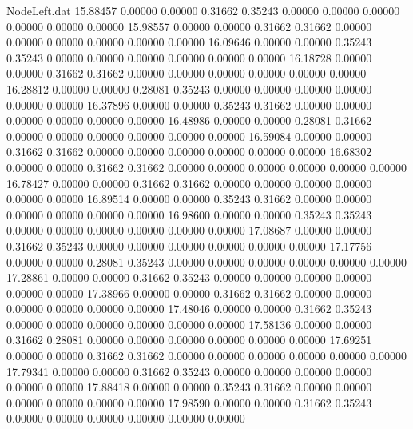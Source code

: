 \begin{filecontents}{NodeLeft.dat}
  15.88457    0.00000    0.00000     0.31662    0.35243    0.00000    0.00000    0.00000    0.00000    0.00000    0.00000
  15.98557    0.00000    0.00000     0.31662    0.31662    0.00000    0.00000    0.00000    0.00000    0.00000    0.00000
  16.09646    0.00000    0.00000     0.35243    0.35243    0.00000    0.00000    0.00000    0.00000    0.00000    0.00000
  16.18728    0.00000    0.00000     0.31662    0.31662    0.00000    0.00000    0.00000    0.00000    0.00000    0.00000
  16.28812    0.00000    0.00000     0.28081    0.35243    0.00000    0.00000    0.00000    0.00000    0.00000    0.00000
  16.37896    0.00000    0.00000     0.35243    0.31662    0.00000    0.00000    0.00000    0.00000    0.00000    0.00000
  16.48986    0.00000    0.00000     0.28081    0.31662    0.00000    0.00000    0.00000    0.00000    0.00000    0.00000
  16.59084    0.00000    0.00000     0.31662    0.31662    0.00000    0.00000    0.00000    0.00000    0.00000    0.00000
  16.68302    0.00000    0.00000     0.31662    0.31662    0.00000    0.00000    0.00000    0.00000    0.00000    0.00000
  16.78427    0.00000    0.00000     0.31662    0.31662    0.00000    0.00000    0.00000    0.00000    0.00000    0.00000
  16.89514    0.00000    0.00000     0.35243    0.31662    0.00000    0.00000    0.00000    0.00000    0.00000    0.00000
  16.98600    0.00000    0.00000     0.35243    0.35243    0.00000    0.00000    0.00000    0.00000    0.00000    0.00000
  17.08687    0.00000    0.00000     0.31662    0.35243    0.00000    0.00000    0.00000    0.00000    0.00000    0.00000
  17.17756    0.00000    0.00000     0.28081    0.35243    0.00000    0.00000    0.00000    0.00000    0.00000    0.00000
  17.28861    0.00000    0.00000     0.31662    0.35243    0.00000    0.00000    0.00000    0.00000    0.00000    0.00000
  17.38966    0.00000    0.00000     0.31662    0.31662    0.00000    0.00000    0.00000    0.00000    0.00000    0.00000
  17.48046    0.00000    0.00000     0.31662    0.35243    0.00000    0.00000    0.00000    0.00000    0.00000    0.00000
  17.58136    0.00000    0.00000     0.31662    0.28081    0.00000    0.00000    0.00000    0.00000    0.00000    0.00000
  17.69251    0.00000    0.00000     0.31662    0.31662    0.00000    0.00000    0.00000    0.00000    0.00000    0.00000
  17.79341    0.00000    0.00000     0.31662    0.35243    0.00000    0.00000    0.00000    0.00000    0.00000    0.00000
  17.88418    0.00000    0.00000     0.35243    0.31662    0.00000    0.00000    0.00000    0.00000    0.00000    0.00000
  17.98590    0.00000    0.00000     0.31662    0.35243    0.00000    0.00000    0.00000    0.00000    0.00000    0.00000

\end{filecontents}
